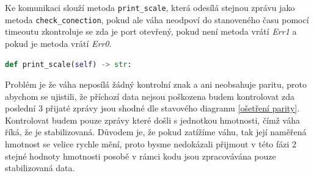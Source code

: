 Ke komunikaci slouží metoda  \texttt{print\_scale}, která odesílá stejnou zprávu jako metoda \texttt{check\_conection}, pokud ale váha neodpoví do stanoveného času pomocí timeoutu zkontroluje se zda je port otevřený, pokud není metoda vrátí \textit{Err1} a pokud je metoda vrátí \textit{Err0}.

\begin{lstlisting}[language=Python,breaklines=false, frame=single]
def print_scale(self) -> str:
\end{lstlisting}
Problém je že váha neposílá žádný kontrolní znak a ani neobsahuje paritu, proto abychom se ujistili, že příchozí data nejsou poškozena budem kontrolovat zda poslední 3 přijaté zprávy jsou shodné dle stavového diagramu \ref{ošetření parity}. Kontrolovat budem pouze zprávy které došli s jednotkou hmotnosti, čímž váha říká, že je stabilizovaná. Důvodem je, že pokud zatížíme váhu, tak její naměřená hmotnost se velice rychle mění, proto bysme nedokázali přijmout v této fázi 2 stejné hodnoty hmotnosti posobě v rámci kodu jsou zpracovávána pouze stabilizovaná data.


%
%
%
%
%
%
%
%
%
%

